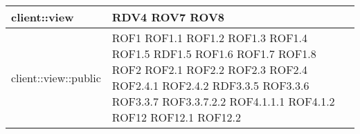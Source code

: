 \begin{center}
\begin{longtable}{| p{9cm} | p{4cm} |}
\hline
client::view  & RDV4 \newline ROV7 \newline ROV8 \\
\hline
client::view::public  &  ROF1 \newline ROF1.1 \newline ROF1.2 \newline ROF1.3 \newline ROF1.4 \newline ROF1.5 \newline RDF1.5 \newline ROF1.6 \newline ROF1.7 \newline ROF1.8 \newline ROF2 \newline ROF2.1 \newline ROF2.2 \newline ROF2.3 \newline ROF2.4 \newline ROF2.4.1 \newline ROF2.4.2 \newline RDF3.3.5 \newline ROF3.3.6 \newline ROF3.3.7 \newline ROF3.3.7.2.2 \newline ROF4.1.1.1 \newline ROF4.1.2 \newline ROF12 \newline ROF12.1 \newline ROF12.2 \newline \\
\hline

\end{longtable}
\end{center}

